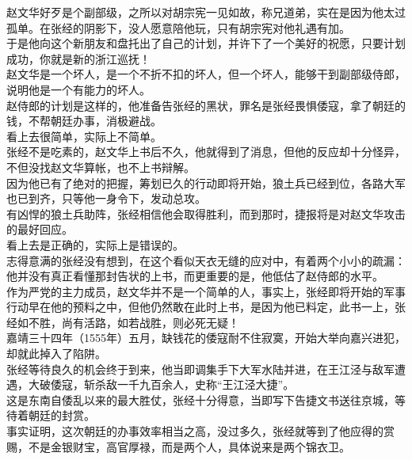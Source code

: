 \begin{multicols}{\theparacolNo}
赵文华好歹是个副部级，之所以对胡宗宪一见如故，称兄道弟，实在是因为他太过孤单。在张经的阴影下，没人愿意陪他玩，只有胡宗宪对他礼遇有加。\\

于是他向这个新朋友和盘托出了自己的计划，并许下了一个美好的祝愿，只要计划成功，你就是新的浙江巡抚！\\

赵文华是一个坏人，是一个不折不扣的坏人，但一个坏人，能够干到副部级侍郎，说明他是一个有能力的坏人。\\

赵侍郎的计划是这样的，他准备告张经的黑状，罪名是张经畏惧倭寇，拿了朝廷的钱，不帮朝廷办事，消极避战。\\

看上去很简单，实际上不简单。\\

张经不是吃素的，赵文华上书后不久，他就得到了消息，但他的反应却十分怪异，不但没找赵文华算帐，也不上书辩解。\\

因为他已有了绝对的把握，筹划已久的行动即将开始，狼土兵已经到位，各路大军也已到齐，只等他一身令下，发动总攻。\\

有凶悍的狼土兵助阵，张经相信他会取得胜利，而到那时，捷报将是对赵文华攻击的最好回应。\\

看上去是正确的，实际上是错误的。\\

志得意满的张经没有想到，在这个看似天衣无缝的应对中，有着两个小小的疏漏：他并没有真正看懂那封告状的上书，而更重要的是，他低估了赵侍郎的水平。\\

作为严党的主力成员，赵文华并不是一个简单的人，事实上，张经即将开始的军事行动早在他的预料之中，但他仍然敢在此时上书，是因为他已料定，此书一上，张经如不胜，尚有活路，如若战胜，则必死无疑！\\

嘉靖三十四年（1555年）五月，缺钱花的倭寇耐不住寂寞，开始大举向嘉兴进犯，却就此掉入了陷阱。\\

张经等待良久的机会终于到来，他当即调集手下大军水陆并进，在王江泾与敌军遭遇，大破倭寇，斩杀敌一千九百余人，史称“王江泾大捷”。\\

这是东南自倭乱以来的最大胜仗，张经十分得意，当即写下告捷文书送往京城，等待着朝廷的封赏。\\

事实证明，这次朝廷的办事效率相当之高，没过多久，张经就等到了他应得的赏赐，不是金银财宝，高官厚禄，而是两个人，具体说来是两个锦衣卫。\\


\end{multicols}
